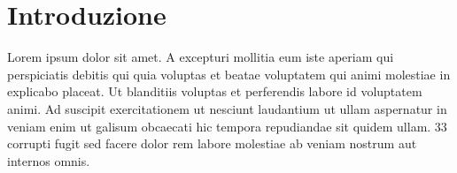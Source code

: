 \section{Introduzione}

Lorem ipsum dolor sit amet. A excepturi mollitia eum iste aperiam qui
perspiciatis debitis qui quia voluptas et beatae voluptatem qui animi molestiae
in explicabo placeat. Ut blanditiis voluptas et perferendis labore id voluptatem
animi. Ad suscipit exercitationem ut nesciunt laudantium ut ullam aspernatur in
veniam enim ut galisum obcaecati hic tempora repudiandae sit quidem ullam. 33
corrupti fugit sed facere dolor rem labore molestiae ab veniam nostrum aut
internos omnis.